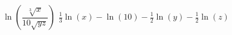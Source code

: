 {$\ln \left(\dfrac{\sqrt[3]{x}}{10 \sqrt{yz}}\right)$ }
{ $\frac{1}{3} \ln(x) - \ln(10) - \frac{1}{2}\ln(y)-\frac{1}{2}\ln(z)$}

